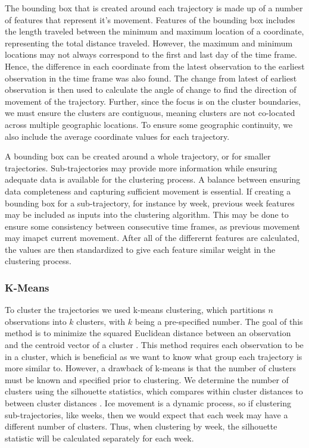 \documentclass[12pt]{article}
\begin{document}
The bounding box that is created around each trajectory is made up of a
number of features that represent it's movement. Features of the
bounding box includes the length traveled between the minimum and
maximum location of a coordinate, representing the total distance
traveled. However, the maximum and minimum locations may not always
correspond to the first and last day of the time frame. Hence, the
difference in each coordinate from the latest observation to the
earliest observation in the time frame was also found. The change from
latest of earliest observation is then used to calculate the angle of
change to find the direction of movement of the trajectory. Further,
since the focus is on the cluster boundaries, we must ensure the
clusters are contiguous, meaning clusters are not co-located across
multiple geographic locations. To ensure some geographic continuity, we
also include the average coordinate values for each trajectory.

A bounding box can be created around a whole trajectory, or for smaller
trajectories. Sub-trajectories may provide more information while
ensuring adequate data is available for the clustering process. A
balance between ensuring data completeness and capturing sufficient
movement is essential. If creating a bounding box for a sub-trajectory,
for instance by week, previous week features may be included as inputs
into the clustering algorithm. This may be done to ensure some
consistency between consecutive time frames, as previous movement may
imapct current movement. After all of the differernt features are
calculated, the values are then standardized to give each feature
similar weight in the clustering process.

\hypertarget{k-means}{%
\subsubsection{K-Means}\label{k-means}}

To cluster the trajectories we used k-means clustering, which partitions
\(n\) observations into \(k\) clusters, with \(k\) being a pre-specified
number. The goal of this method is to minimize the squared Euclidean
distance between an observation and the centroid vector of a cluster
\citep{steinley_kmeans_2006}. This method requires each observation to
be in a cluster, which is beneficial as we want to know what group each
trajectory is more similar to. However, a drawback of k-means is that
the number of clusters must be known and specified prior to clustering.
We determine the number of clusters using the silhouette statistics,
which compares within cluster distances to between cluster distances
\citep{kodinariya_2013}. Ice movement is a dynamic process, so if
clustering sub-trajectories, like weeks, then we would expect that each
week may have a different number of clusters. Thus, when clustering by
week, the silhouette statistic will be calculated separately for each
week.
\end{document}
